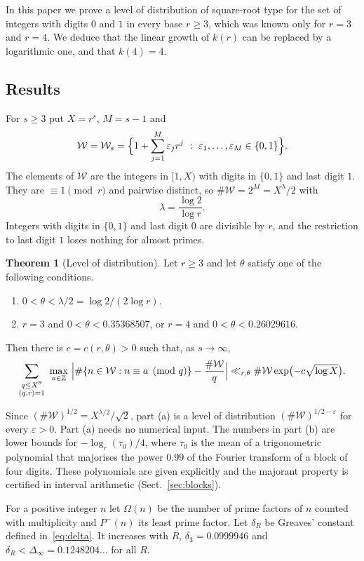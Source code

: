 \documentclass[11pt]{amsart}
\theoremstyle{definition}
\newtheorem{theorem}{Theorem}[section]
\numberwithin{equation}{section}
\newcommand{\Z}{\mathbb{Z}}
\newcommand{\WW}{\mathcal{W}}
\begin{document}
In this paper we prove a level of distribution of square-root type for the set of integers with digits $0$ and $1$ in every base $r\ge3$, which was known only for $r=3$ and $r=4$. We deduce that the linear growth of $k(r)$ can be replaced by a logarithmic one, and that $k(4)=4$.

\subsection{Results}

For $s\ge3$ put $X=r^s$, $M=s-1$ and
\[
\WW=\WW_s=\Bigl\{1+\sum_{j=1}^{M}\varepsilon_jr^j\ :\ \varepsilon_1,\dots,\varepsilon_M\in\{0,1\}\Bigr\}.
\]
The elements of $\WW$ are the integers in $[1,X)$ with digits in $\{0,1\}$ and last digit $1$. They are $\equiv1\pmod r$ and pairwise distinct, so $\#\WW=2^{M}=X^{\lambda}/2$ with
\[
\lambda=\frac{\log2}{\log r}.
\]
Integers with digits in $\{0,1\}$ and last digit $0$ are divisible by $r$, and the restriction to last digit $1$ loses nothing for almost primes.

\begin{theorem}[Level of distribution]\label{thm:level}
Let $r\ge3$ and let $\theta$ satisfy one of the following conditions.
\begin{enumerate}
\item[(a)] $0<\theta<\lambda/2=\log2/(2\log r)$.
\item[(b)] $r=3$ and $0<\theta<0.35368507$, or $r=4$ and $0<\theta<0.26029616$.
\end{enumerate}
Then there is $c=c(r,\theta)>0$ such that, as $s\to\infty$,
\[
\sum_{\substack{q\le X^{\theta}\\(q,r)=1}}\ \max_{a\in\Z}\ \Bigl|\#\{n\in\WW:n\equiv a\pmod q\}-\frac{\#\WW}{q}\Bigr|\ll_{r,\theta}\#\WW\exp\bigl(-c\sqrt{\log X}\bigr).
\]
\end{theorem}

Since $(\#\WW)^{1/2}=X^{\lambda/2}/\sqrt2$, part (a) is a level of distribution $(\#\WW)^{1/2-\varepsilon}$ for every $\varepsilon>0$. Part (a) needs no numerical input. The numbers in part (b) are lower bounds for $-\log_r(\tau_0)/4$, where $\tau_0$ is the mean of a trigonometric polynomial that majorises the power $0.99$ of the Fourier transform of a block of four digits. These polynomials are given explicitly and the majorant property is certified in interval arithmetic (Sect.~\ref{sec:blocks}).

For a positive integer $n$ let $\Omega(n)$ be the number of prime factors of $n$ counted with multiplicity and $P^-(n)$ its least prime factor. Let $\delta_R$ be Greaves' constant defined in~\eqref{eq:delta}. It increases with $R$, $\delta_3=0.0999946$ and $\delta_R<\Delta_\infty=0.1248204\ldots$ for all $R$.
\end{document}
